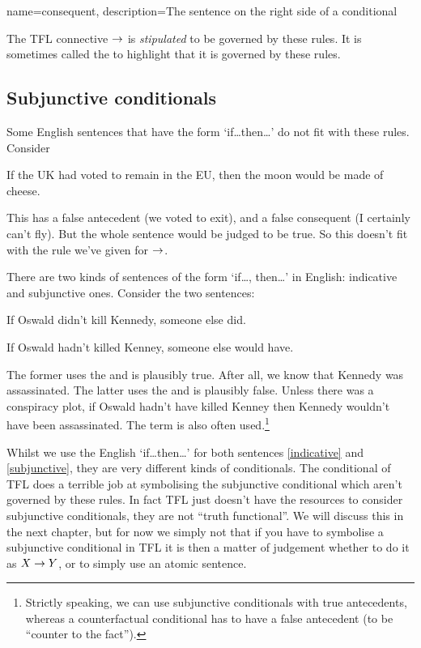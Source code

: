 {
name=consequent,
description={The sentence on the right side of a \gls{conditional}}
}

The TFL connective $\rightarrow$ is \emph{stipulated} to be governed by these rules. It is sometimes called the  to highlight that it is governed by these rules. 

\subsection{Subjunctive conditionals}\label{s:IndicativeSubjunctive}
Some English sentences that have the form `if\ldots then\ldots' do not fit with these rules.
Consider 
\begin{earg}
\item[\ex{brexit}] If the UK had voted to remain in the EU, then the moon would be made of cheese.
\end{earg}
This has a false antecedent (we voted to exit), and a false consequent (I certainly can't fly). But the whole sentence would be judged to be true. So this doesn't fit with the rule we've given for $\rightarrow$. 

There are two kinds of sentences of the form `if\ldots, then\ldots' in English: indicative and subjunctive ones. 
Consider the two sentences:
\begin{earg}
\item[\ex{indicative}] If Oswald didn't kill Kennedy, someone else did.
\item[\ex{subjunctive}] If Oswald hadn't killed Kenney, someone else would have.
\end{earg}
The former uses the  and is plausibly true. After all, we know that Kennedy was assassinated. The latter uses the  and is plausibly false. Unless there was a conspiracy plot, if Oswald hadn't have killed Kenney then Kennedy wouldn't have been assassinated. The term  is also often used.\footnote{Strictly speaking, we can use subjunctive conditionals with true antecedents, whereas a counterfactual conditional has to have a false antecedent (to be ``counter to the fact'').} 

Whilst we use the English `if\ldots then\ldots' for both sentences \ref{indicative} and \ref{subjunctive}, they are very different kinds of conditionals. The conditional of TFL does a terrible job at symbolising the subjunctive conditional which aren't governed by these rules. In fact TFL just doesn't have the resources to consider subjunctive conditionals, they are not ``truth functional''. We will discuss this in the next chapter, but for now we simply not that if you have to symbolise a subjunctive conditional in TFL it is then a matter of judgement whether to do it as $X\rightarrow Y$, or to simply use an atomic sentence. 

